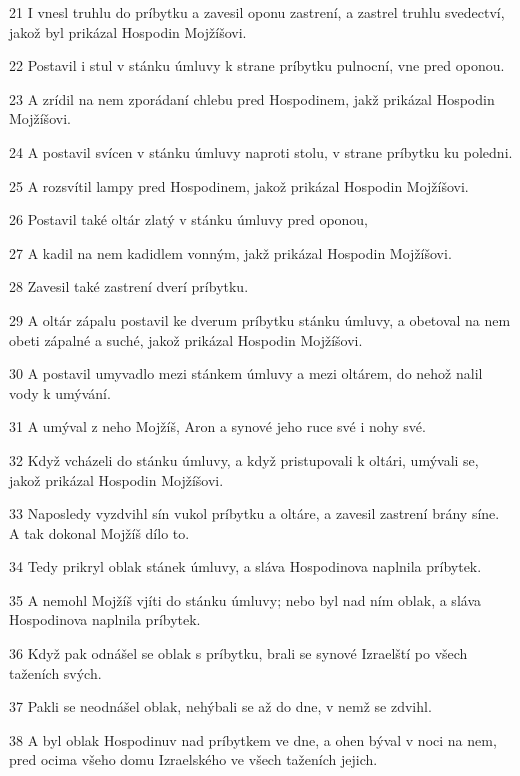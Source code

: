 \par 21 I vnesl truhlu do príbytku a zavesil oponu zastrení, a zastrel truhlu svedectví, jakož byl prikázal Hospodin Mojžíšovi.
\par 22 Postavil i stul v stánku úmluvy k strane príbytku pulnocní, vne pred oponou.
\par 23 A zrídil na nem zporádaní chlebu pred Hospodinem, jakž prikázal Hospodin Mojžíšovi.
\par 24 A postavil svícen v stánku úmluvy naproti stolu, v strane príbytku ku poledni.
\par 25 A rozsvítil lampy pred Hospodinem, jakož prikázal Hospodin Mojžíšovi.
\par 26 Postavil také oltár zlatý v stánku úmluvy pred oponou,
\par 27 A kadil na nem kadidlem vonným, jakž prikázal Hospodin Mojžíšovi.
\par 28 Zavesil také zastrení dverí príbytku.
\par 29 A oltár zápalu postavil ke dverum príbytku stánku úmluvy, a obetoval na nem obeti zápalné a suché, jakož prikázal Hospodin Mojžíšovi.
\par 30 A postavil umyvadlo mezi stánkem úmluvy a mezi oltárem, do nehož nalil vody k umývání.
\par 31 A umýval z neho Mojžíš, Aron a synové jeho ruce své i nohy své.
\par 32 Když vcházeli do stánku úmluvy, a když pristupovali k oltári, umývali se, jakož prikázal Hospodin Mojžíšovi.
\par 33 Naposledy vyzdvihl sín vukol príbytku a oltáre, a zavesil zastrení brány síne. A tak dokonal Mojžíš dílo to.
\par 34 Tedy prikryl oblak stánek úmluvy, a sláva Hospodinova naplnila príbytek.
\par 35 A nemohl Mojžíš vjíti do stánku úmluvy; nebo byl nad ním oblak, a sláva Hospodinova naplnila príbytek.
\par 36 Když pak odnášel se oblak s príbytku, brali se synové Izraelští po všech taženích svých.
\par 37 Pakli se neodnášel oblak, nehýbali se až do dne, v nemž se zdvihl.
\par 38 A byl oblak Hospodinuv nad príbytkem ve dne, a ohen býval v noci na nem, pred ocima všeho domu Izraelského ve všech taženích jejich.

